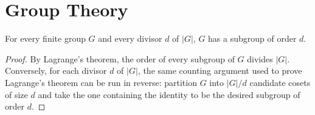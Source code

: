 \section{Group Theory}

\begin{theorem}
For every finite group $G$ and every divisor $d$ of $|G|$, $G$ has a
subgroup of order $d$.
\end{theorem}

\begin{proof}
By Lagrange's theorem, the order of every subgroup of $G$ divides $|G|$.
Conversely, for each divisor $d$ of $|G|$, the same counting argument used
to prove Lagrange's theorem can be run in reverse: partition $G$ into
$|G|/d$ candidate cosets of size $d$ and take the one containing the
identity to be the desired subgroup of order $d$.
\end{proof}

